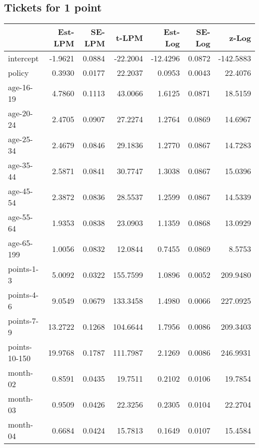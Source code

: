 \documentclass[10pt]{article}
\begin{document}

\subsection{Tickets for 1 point}




\begin{table}[ht]
\centering
\begin{tabular}{lrrrrrr}
  \hline
 & Est-LPM & SE-LPM & t-LPM & Est-Log & SE-Log & z-Log \\ 
  \hline
intercept & -1.9621 & 0.0884 & -22.2004 & -12.4296 & 0.0872 & -142.5883 \\ 
  policy & 0.3930 & 0.0177 & 22.2037 & 0.0953 & 0.0043 & 22.4076 \\ 
  age-16-19 & 4.7860 & 0.1113 & 43.0066 & 1.6125 & 0.0871 & 18.5159 \\ 
  age-20-24 & 2.4705 & 0.0907 & 27.2274 & 1.2764 & 0.0869 & 14.6967 \\ 
  age-25-34 & 2.4679 & 0.0846 & 29.1836 & 1.2770 & 0.0867 & 14.7283 \\ 
  age-35-44 & 2.5871 & 0.0841 & 30.7747 & 1.3038 & 0.0867 & 15.0396 \\ 
  age-45-54 & 2.3872 & 0.0836 & 28.5537 & 1.2599 & 0.0867 & 14.5339 \\ 
  age-55-64 & 1.9353 & 0.0838 & 23.0903 & 1.1359 & 0.0868 & 13.0929 \\ 
  age-65-199 & 1.0056 & 0.0832 & 12.0844 & 0.7455 & 0.0869 & 8.5753 \\ 
  points-1-3 & 5.0092 & 0.0322 & 155.7599 & 1.0896 & 0.0052 & 209.9480 \\ 
  points-4-6 & 9.0549 & 0.0679 & 133.3458 & 1.4980 & 0.0066 & 227.0925 \\ 
  points-7-9 & 13.2722 & 0.1268 & 104.6644 & 1.7956 & 0.0086 & 209.3403 \\ 
  points-10-150 & 19.9768 & 0.1787 & 111.7987 & 2.1269 & 0.0086 & 246.9931 \\ 
  month-02 & 0.8591 & 0.0435 & 19.7511 & 0.2102 & 0.0106 & 19.7854 \\ 
  month-03 & 0.9509 & 0.0426 & 22.3256 & 0.2305 & 0.0104 & 22.2704 \\ 
  month-04 & 0.6684 & 0.0424 & 15.7813 & 0.1649 & 0.0107 & 15.4584 \\ 

\end{tabular}
\end{table}
\end{document}

